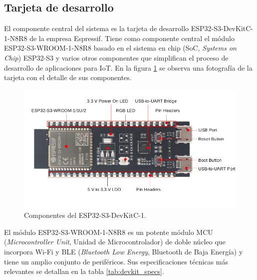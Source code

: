 \subsection{Tarjeta de desarrollo}
El componente central del sistema es la tarjeta de desarrollo ESP32-S3-DevKitC-1-N8R8 de la empresa Espressif. Tiene como componente central el módulo ESP32-S3-WROOM-1-N8R8 basado en el sistema en chip (SoC, \textit{Systems on Chip}) ESP32-S3 y varios otros componentes que simplifican el proceso de desarrollo de aplicaciones para IoT. En la figura \ref{fig:devkit_comp} se observa una fotografía de la tarjeta con el detalle de sus componentes.

\begin{figure}[h]
	\centering
	\includegraphics[scale=0.45]{./Figures/devkit_comp.png}
	\caption{Componentes del ESP32-S3-DevKitC-1\protect\footnotemark.}
	\label{fig:devkit_comp}
\end{figure}

El módulo ESP32-S3-WROOM-1-N8R8 es un potente módulo MCU (\textit{Microcontroller Unit}, Unidad de Microcontrolador) de doble núcleo que incorpora Wi-Fi y BLE (\textit{Bluetooth Low Energy}, Bluetooth de Baja Energía) y tiene un amplio conjunto de periféricos. Sus especificaciones técnicas más relevantes se detallan en la tabla \ref{tab:devkit_specs}.

